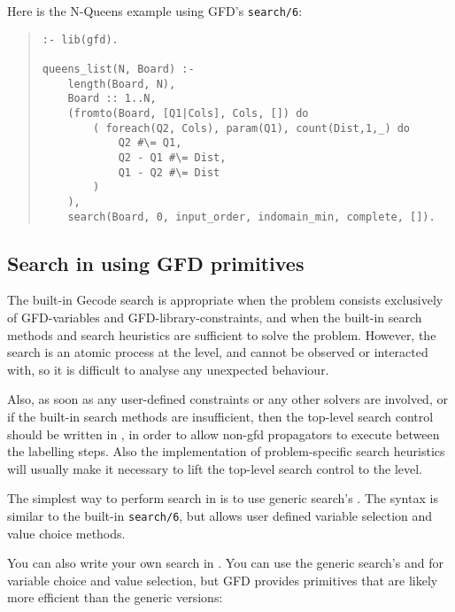Here is the N-Queens example using GFD's \texttt{search/6}:
\begin{quote}
\begin{verbatim}
:- lib(gfd).

queens_list(N, Board) :-
    length(Board, N),
    Board :: 1..N,
    (fromto(Board, [Q1|Cols], Cols, []) do
        ( foreach(Q2, Cols), param(Q1), count(Dist,1,_) do
            Q2 #\= Q1,
            Q2 - Q1 #\= Dist,
            Q1 - Q2 #\= Dist
        )
    ),
    search(Board, 0, input_order, indomain_min, complete, []).
\end{verbatim}
\end{quote}


\subsection{Search in {\eclipse} using GFD primitives\label{searchgfd}}

The built-in Gecode search is appropriate when the problem consists
exclusively of GFD-variables and GFD-library-constraints, and when the
built-in search methods and search heuristics are sufficient to solve
the problem. However, the search is an atomic process at the 
{\eclipse} level, and cannot be observed or interacted with, so it is
difficult to analyse any unexpected behaviour.

Also, as soon as any user-defined constraints or any other {\eclipse}
solvers are involved, or if the built-in search methods are insufficient, 
then the top-level search control should be
written in \eclipse, in order to allow non-gfd propagators to execute
between the labelling steps.  Also the implementation of problem-specific
search heuristics will usually make it necessary to lift the top-level
search control to the {\eclipse} level.

The simplest way to perform search in {\eclipse} is to use generic search's 
. The syntax is similar to the built-in {\tt search/6}, but allows user defined variable selection and value choice methods.

You can also write your own search in {\eclipse}. You can use the generic 
search's  
and 
for variable choice and value selection, but 
GFD provides primitives that are likely more efficient than the generic 
versions:  

